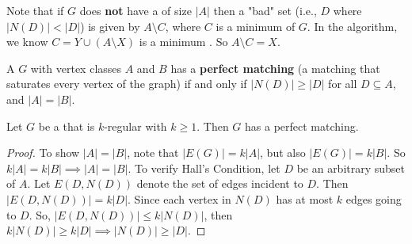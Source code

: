 \documentclass[english, 11pt]{article}
\begin{document}
Note that if $G$ does \textbf{not} have a  of size $|A|$ then a "bad" set (i.e., $D$ where $|N(D)| < |D|$) is given by $A \setminus C$, where $C$ is a minimum  of $G$. In the   algorithm, we know $C = Y \cup (A \setminus X)$ is a minimum . So $A \setminus C = X$.

\begin{cor}
  A   $G$ with vertex classes $A$ and $B$ has a \textbf{perfect matching} (a matching that saturates every vertex of the graph) if and only if $|N(D)| \geq |D|$ for all $D \subseteq A$, and $|A| = |B|$.
\end{cor}

\begin{cor}
  Let $G$ be a   that is $k$-regular with $k \geq 1$. Then $G$ has a perfect matching.
\end{cor}
\begin{proof}
  To show $|A| = |B|$, note that $|E(G)| = k|A|$, but also $|E(G)| = k|B|$. So $k|A| = k|B| \implies |A| = |B|$. To verify Hall's Condition, let $D$ be an arbitrary subset of $A$. Let $E(D, N(D))$ denote the set of edges incident to $D$. Then $|E(D, N(D))| = k|D|$. Since each vertex in $N(D)$ has at most $k$ edges going to $D$. So, $|E(D, N(D))| \leq k|N(D)|$, then $k|N(D)| \geq k|D| \implies |N(D)| \geq |D|$.
\end{proof}
  
\end{document}
